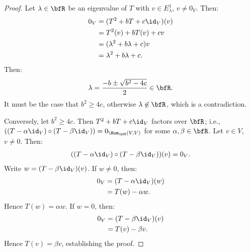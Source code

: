 \documentclass[10pt,twoside,openany]{memoir}
\begin{document}
        \begin{proof}
            Let $\lambda \in \bfR$ be an eigenvalue of $T$ with $v \in E_\lambda^1$, $v\neq 0_V$. Then:
                \begin{equation*}
                \begin{split}
                    0_V &= (T^2 +bT + c\id_V)(v) \\
                    & = T^2(v) + bT(v) + cv \\
                    & = (\lambda^2 + b\lambda + c)v \\
                    & = \lambda^2 + b\lambda + c.
                \end{split}
                \end{equation*}
            Then:
                \begin{equation*}
                \begin{split}
                    \lambda = \frac{-b \pm \sqrt{b^2 - 4c}}{2} \in \bfR.
                \end{split}
                \end{equation*}
            It must be the case that $b^2 \geq 4c$, otherwise $\lambda \not\in \bfR$, which is a contradiction.

            Conversely, let $b^2 \geq 4c$. Then $T^2 + bT + c\id_V$ factors over $\bfR$; i.e., $((T - \alpha \id_V)\circ (T - \beta \id_V)) = 0_{\Hom_\bfR(V,V)}$ for some $\alpha,\beta \in \bfR$. Let $v \in V$, $v\neq 0$. Then:
                \begin{equation*}
                \begin{split}
                    ((T-\alpha\id_V)\circ(T-\beta\id_V))(v) = 0_V.
                \end{split}
                \end{equation*}
            Write $w = (T - \beta\id_V)(v)$. If $w \neq 0$, then:
                \begin{equation*}
                \begin{split}
                    0_V &= (T-\alpha\id_V)(w) \\
                    & = T(w) - \alpha w.
                \end{split}
                \end{equation*}
            Hence $T(w) = \alpha w$. If $w = 0$, then:
                \begin{equation*}
                \begin{split}
                    0_V &= (T-\beta\id_V)(v) \\
                    & = T(v) - \beta v.
                \end{split}
                \end{equation*}
            Hence $T(v) = \beta v$, establishing the proof. 
        \end{proof}
\end{document}
